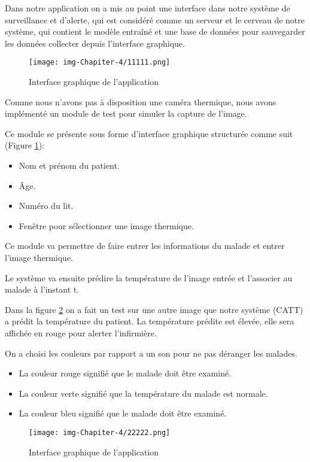 \documentclass[12pt]{article}
\begin{document}
Dans notre application on a mis au point une interface dans notre système de surveillance et d’alerte, qui est considéré comme un serveur et le cerveau de notre système, qui contient le modèle entraîné et une base de données pour sauvegarder les données collecter depuis l’interface graphique.

\begin{figure}[h]
	\centring
	\texttt{[image: img-Chapiter-4/11111.png]}
	\caption{Interface graphique de l'application}
	\label{fig:interface}
\end{figure}

Comme nous n'avons pas à disposition une caméra thermique, nous avons implémenté un module de test pour simuler la capture de l'image.

Ce module se présente sous forme d'interface graphique structurée comme suit (Figure \ref{fig:interface}):
\begin{itemize}
	\item Nom et prénom du patient.
	\item \^ Age.
	\item Numéro du lit.
	\item Fenêtre pour sélectionner une image thermique.
\end{itemize}

Ce module va permettre de faire entrer les informations du malade et entrer l'image thermique.

Le système va ensuite prédire la température de l'image entrée et l'associer au malade à l'instant t.

\newpage
Dans la figure \ref{fig:1001} on a fait un test sur une autre image que notre système (CATT) a prédit la température du patient. La température prédite est élevée, elle sera affichée en rouge pour alerter l'infirmière.

On a choisi les couleurs par rapport a un son pour ne pas déranger les malades.
\begin{itemize}
	\item La couleur rouge signifié que le malade doit être examiné.
	\item La couleur verte signifié que la température du malade est normale.
	\item La couleur bleu signifié que le malade doit être examiné. 
\end{itemize}

\begin{figure}[h]
	\centring
	\texttt{[image: img-Chapiter-4/22222.png]}
	\caption{Interface graphique de l'application}
	\label{fig:1001}
\end{figure}
\end{document}
